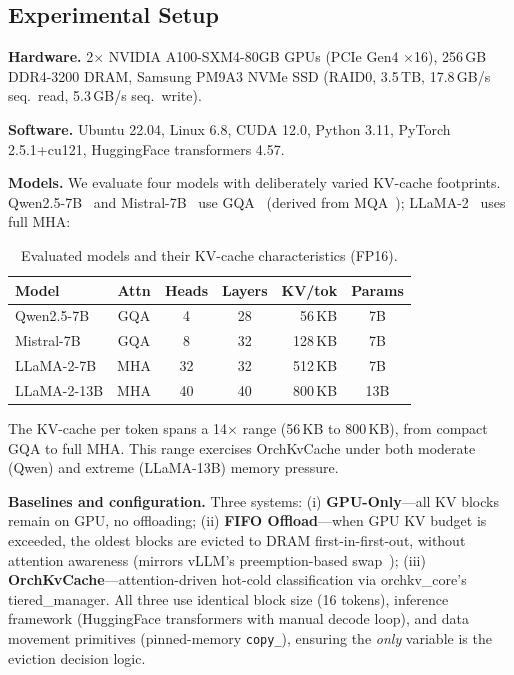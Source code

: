 \documentclass[conference]{IEEEtran}
\begin{document}
\subsection{Experimental Setup}

\textbf{Hardware.} 2$\times$ NVIDIA A100-SXM4-80GB GPUs (PCIe Gen4 $\times$16), 256\,GB DDR4-3200 DRAM, Samsung PM9A3 NVMe SSD (RAID0, 3.5\,TB, 17.8\,GB/s seq.\ read, 5.3\,GB/s seq.\ write).

\textbf{Software.} Ubuntu 22.04, Linux 6.8, CUDA 12.0, Python 3.11, PyTorch 2.5.1+cu121, HuggingFace transformers 4.57.

\textbf{Models.} We evaluate four models with deliberately varied KV-cache footprints.  Qwen2.5-7B~\cite{qwen2.5} and Mistral-7B~\cite{mistral} use GQA~\cite{gqa} (derived from MQA~\cite{mqa}); LLaMA-2~\cite{llama2} uses full MHA:

\begin{table}[t]
\centering
\caption{Evaluated models and their KV-cache characteristics (FP16).}
\label{tab:models}
\footnotesize
\setlength{\tabcolsep}{7pt}
\begin{tabular}{@{}lcccrc@{}}
\toprule
Model & Attn & Heads & Layers & KV/tok & Params \\
\midrule
Qwen2.5-7B   & GQA  & 4  & 28 & 56\,KB  & 7B  \\
Mistral-7B   & GQA  & 8  & 32 & 128\,KB & 7B  \\
LLaMA-2-7B   & MHA  & 32 & 32 & 512\,KB & 7B  \\
LLaMA-2-13B  & MHA  & 40 & 40 & 800\,KB & 13B \\
\bottomrule
\end{tabular}
\end{table}

The KV-cache per token spans a 14$\times$ range (56\,KB to 800\,KB), from compact GQA to full MHA. This range exercises OrchKvCache under both moderate (Qwen) and extreme (LLaMA-13B) memory pressure.

\textbf{Baselines and configuration.} Three systems: (i) \textbf{GPU-Only}---all KV blocks remain on GPU, no offloading; (ii) \textbf{FIFO Offload}---when GPU KV budget is exceeded, the oldest blocks are evicted to DRAM first-in-first-out, without attention awareness (mirrors vLLM's preemption-based swap~\cite{vllm}); (iii) \textbf{OrchKvCache}---attention-driven hot-cold classification via orchkv\_core's tiered\_manager. All three use identical block size (16 tokens), inference framework (HuggingFace transformers with manual decode loop), and data movement primitives (pinned-memory \texttt{copy\_}), ensuring the \emph{only} variable is the eviction decision logic.
\end{document}
